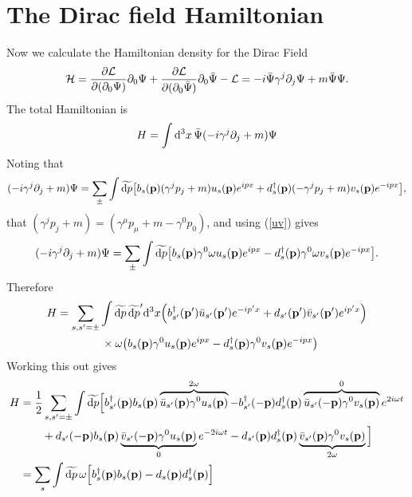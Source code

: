 \section{The Dirac field Hamiltonian}
Now we calculate the Hamiltonian density for the Dirac Field
\begin{equation}
    \mathcal{H}=\pdv{\mathcal{L}}{(\partial_0\Psi)}\partial_0\Psi+\pdv{\mathcal{L}}{(\partial_0\bar{\Psi})}\partial_0\bar{\Psi}-\mathcal{L}=-i\bar{\Psi}\gamma^j\partial_j\Psi+m\bar{\Psi}\Psi.
\end{equation}
The total Hamiltonian is
\begin{equation}
    H=\int\dd^3 x\, \Bar{\Psi}(-i\gamma^j\partial_j+m)\Psi
\end{equation}
Noting that
\begin{equation}
    (-i\gamma^j\partial_j+m)\Psi=\sum_{\pm}\int\widetilde{\dd p}\qty[b_s(\vb{p})(\gamma^jp_j+m)u_s(\vb{p})e^{ipx}+d^\dagger_{s}(\vb{p})(-\gamma^jp_j+m)v_s(\vb{p})e^{-ipx}],
\end{equation}
that $(\gamma^jp_j+m)=(\gamma^\mu p_\mu+m-\gamma^0p_0)$, and using (\ref{uv}) gives
\begin{equation}
    (-i\gamma^j\partial_j+m)\Psi=\sum_{\pm}\int\widetilde{\dd p}\qty[b_s(\vb{p})\gamma^0\omega u_s(\vb{p})e^{ipx}-d^\dagger_{s}(\vb{p})\gamma^0\omega v_s(\vb{p})e^{-ipx}].
\end{equation}
Therefore
\begin{equation}
\begin{aligned}
     H&=\sum_{s,s^\prime=\pm}\int\widetilde{\dd p}\,\widetilde{\dd p}^\prime\dd^3 x \qty(b^\dagger_{s^\prime}(\vb{p}^\prime)\bar{u}_{s^\prime}(\vb{p}^\prime)e^{-ip^\prime x}+d_{s^\prime}(\vb{p}^\prime)\bar{v}_{s^\prime}(\vb{p}^\prime)e^{ip^\prime x})\\&\qquad\qquad\times\omega\qty(b_s(\vb{p})\gamma^0 u_s(\vb{p})e^{ipx}-d^\dagger_{s}(\vb{p})\gamma^0 v_s(\vb{p})e^{-ipx})
\end{aligned}
\end{equation}
Working this out gives
\begin{equation}
    \begin{aligned}
        H&=\frac{1}{2}\sum_{s,s^\prime=\pm}\int\widetilde{\dd p}\Big{[}b^\dagger_{s^\prime}(\vb{p})b_s(\vb{p})\overbrace{\bar{u}_{s^\prime}(\vb{p})\gamma^0 u_s(\vb{p})}^{2\omega}
        -b^\dagger_{s^\prime}(-\vb{p})d^\dagger_s(\vb{p})\overbrace{\bar{u}_{s^\prime}(-\vb{p})\gamma^0 v_s(\vb{p})}^{0}e^{2i\omega t}\\
        &\qquad+ d_{s^\prime}(-\vb{p})b_s(\vb{p})\underbrace{\bar{v}_{s^\prime}(-\vb{p})\gamma^0u_s(\vb{p})}_{0}e^{-2i\omega t} -d_{s^\prime}(\vb{p})d^\dagger_s(\vb{p})\underbrace{\bar{v}_{s^\prime}(\vb{p})\gamma^0v_s(\vb{p})}_{2\omega}\Big{]}\\
        &=\sum_s\int\widetilde{\dd p}\,\omega\Big{[}b_s^\dagger(\vb{p})b_s(\vb{p})-d_s(\vb{p})d_s^\dagger(\vb{p})\Big{]}   
    \end{aligned}
\end{equation}
